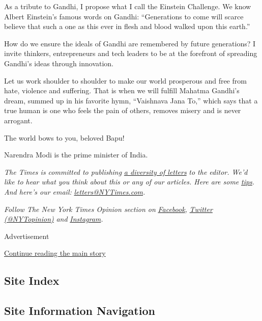As a tribute to Gandhi, I propose what I call the Einstein Challenge. We
know Albert Einstein's famous words on Gandhi: ``Generations to come
will scarce believe that such a one as this ever in flesh and blood
walked upon this earth.''

How do we ensure the ideals of Gandhi are remembered by future
generations? I invite thinkers, entrepreneurs and tech leaders to be at
the forefront of spreading Gandhi's ideas through innovation.

Let us work shoulder to shoulder to make our world prosperous and free
from hate, violence and suffering. That is when we will fulfill Mahatma
Gandhi's dream, summed up in his favorite hymn, ``Vaishnava Jana To,''
which says that a true human is one who feels the pain of others,
removes misery and is never arrogant.

The world bows to you, beloved Bapu!

Narendra Modi is the prime minister of India.

\emph{The Times is committed to publishing}
\href{https://www.nytimes3xbfgragh.onion/2019/01/31/opinion/letters/letters-to-editor-new-york-times-women.html}{\emph{a
diversity of letters}} \emph{to the editor. We'd like to hear what you
think about this or any of our articles. Here are some}
\href{https://help.nytimes3xbfgragh.onion/hc/en-us/articles/115014925288-How-to-submit-a-letter-to-the-editor}{\emph{tips}}\emph{.
And here's our email:}
\href{mailto:letters@NYTimes.com}{\emph{letters@NYTimes.com}}\emph{.}

\emph{Follow The New York Times Opinion section on}
\href{https://www.facebookcorewwwi.onion/nytopinion}{\emph{Facebook}}\emph{,}
\href{http://twitter.com/NYTOpinion}{\emph{Twitter (@NYTopinion)}}
\emph{and}
\href{https://www.instagram.com/nytopinion/}{\emph{Instagram}}\emph{.}

Advertisement

\protect\hyperlink{after-bottom}{Continue reading the main story}

\hypertarget{site-index}{%
\subsection{Site Index}\label{site-index}}

\hypertarget{site-information-navigation}{%
\subsection{Site Information
Navigation}\label{site-information-navigation}}

